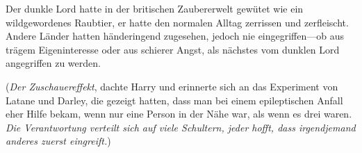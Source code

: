 Der dunkle Lord hatte in der britischen Zaubererwelt gewütet wie ein wildgewordenes Raubtier, er hatte den normalen Alltag zerrissen und zerfleischt. Andere Länder hatten händeringend zugesehen, jedoch nie eingegriffen—ob aus trägem Eigeninteresse oder aus schierer Angst, als nächstes vom dunklen Lord angegriffen zu werden.

(\emph{Der Zuschauereffekt}, dachte Harry und erinnerte sich an das Experiment von Latane und Darley, die gezeigt hatten, dass man bei einem epileptischen Anfall eher Hilfe bekam, wenn nur eine Person in der Nähe war, als wenn es drei waren. \emph{Die Verantwortung verteilt sich auf viele Schultern, jeder hofft, dass irgendjemand anderes zuerst eingreift.})%

